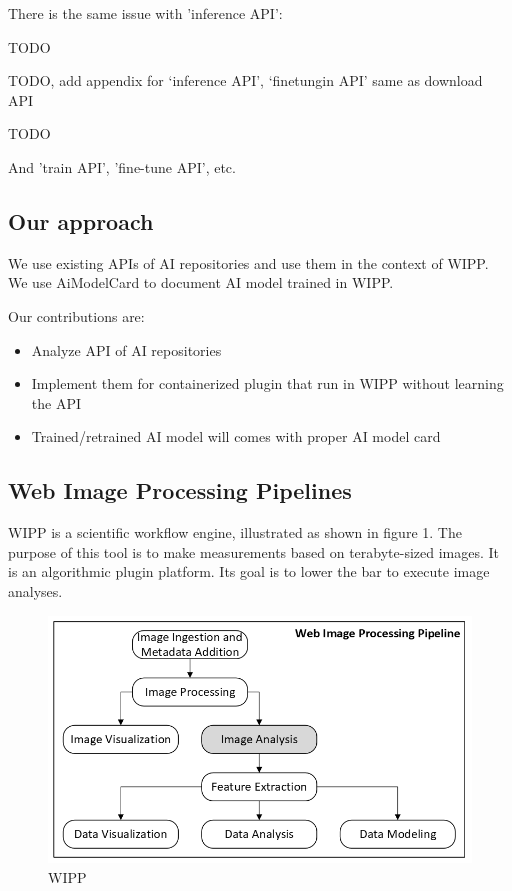 There is the same issue with 'inference API':


TODO

TODO, add appendix for ‘inference API’, ‘finetungin API’ same as download API

TODO


And 'train API', 'fine-tune API', etc.

\subsection{Our approach}

We use existing APIs of AI repositories and use them in the context of
\Gls{WIPP}. We use \Gls{AiModelCard} to document AI model trained in WIPP.

Our contributions are:
\begin{itemize}
  \item Analyze API of AI repositories
  \item Implement them for containerized plugin that run in WIPP without learning the API
  \item Trained/retrained AI model will comes with proper AI model card
\end{itemize}

\subsection{Web Image Processing Pipelines}

WIPP is a scientific workflow engine, illustrated as shown in figure 1.
The purpose of this tool is to make measurements based on terabyte-sized images.
It is an algorithmic plugin platform. Its goal is to lower the bar to execute
image analyses.

\begin{figure}[H]
  \centering
  \includegraphics[width=1.0\linewidth]{png/methods/wipp.png}
  \caption{WIPP}
  \label{fig:1wipp}
\end{figure}

